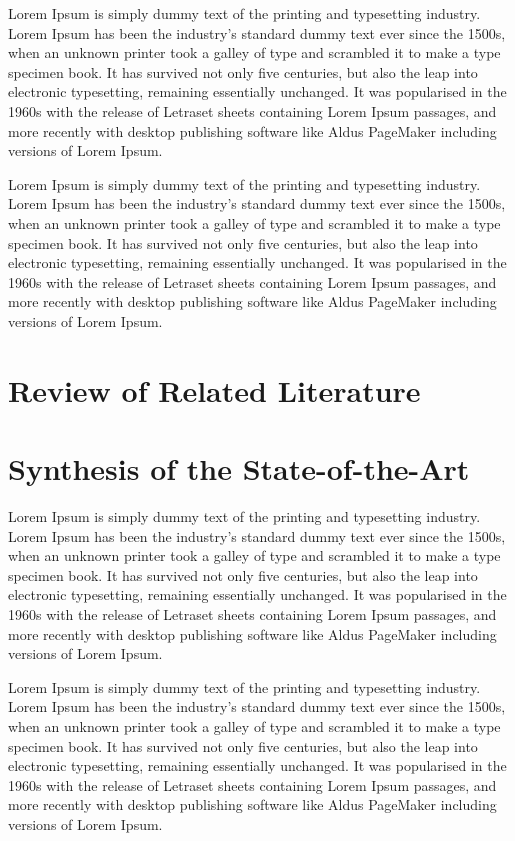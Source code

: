 \documentclass{research}
\begin{document}
Lorem Ipsum is simply dummy text of the printing and typesetting industry. Lorem Ipsum has been the industry's standard dummy text ever since the 1500s, when an unknown printer took a galley of type and scrambled it to make a type specimen book. It has survived not only five centuries, but also the leap into electronic typesetting, remaining essentially unchanged. It was popularised in the 1960s with the release of Letraset sheets containing Lorem Ipsum passages, and more recently with desktop publishing software like Aldus PageMaker including versions of Lorem Ipsum.

Lorem Ipsum is simply dummy text of the printing and typesetting industry. Lorem Ipsum has been the industry's standard dummy text ever since the 1500s, when an unknown printer took a galley of type and scrambled it to make a type specimen book. It has survived not only five centuries, but also the leap into electronic typesetting, remaining essentially unchanged. It was popularised in the 1960s with the release of Letraset sheets containing Lorem Ipsum passages, and more recently with desktop publishing software like Aldus PageMaker including versions of Lorem Ipsum.

\section{Review of Related Literature}

\section{Synthesis of the State-of-the-Art}

Lorem Ipsum is simply dummy text of the printing and typesetting industry. Lorem Ipsum has been the industry's standard dummy text ever since the 1500s, when an unknown printer took a galley of type and scrambled it to make a type specimen book. It has survived not only five centuries, but also the leap into electronic typesetting, remaining essentially unchanged. It was popularised in the 1960s with the release of Letraset sheets containing Lorem Ipsum passages, and more recently with desktop publishing software like Aldus PageMaker including versions of Lorem Ipsum.

Lorem Ipsum is simply dummy text of the printing and typesetting industry. Lorem Ipsum has been the industry's standard dummy text ever since the 1500s, when an unknown printer took a galley of type and scrambled it to make a type specimen book. It has survived not only five centuries, but also the leap into electronic typesetting, remaining essentially unchanged. It was popularised in the 1960s with the release of Letraset sheets containing Lorem Ipsum passages, and more recently with desktop publishing software like Aldus PageMaker including versions of Lorem Ipsum.
\end{document}

